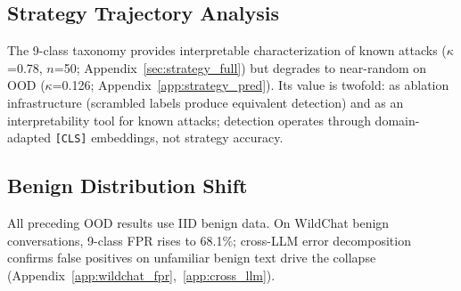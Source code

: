 \subsection{Strategy Trajectory Analysis}
\label{sec:strategy}

The 9-class taxonomy provides interpretable characterization of known attacks ($\kappa$=0.78, $n$=50; Appendix~\ref{sec:strategy_full}) but degrades to near-random on OOD ($\kappa$=0.126; Appendix~\ref{app:strategy_pred}). Its value is twofold: as ablation infrastructure (scrambled labels produce equivalent detection) and as an interpretability tool for known attacks; detection operates through domain-adapted \texttt{[CLS]} embeddings, not strategy accuracy.

\subsection{Benign Distribution Shift}
\label{sec:benign_shift}

All preceding OOD results use IID benign data. On WildChat benign conversations, 9-class FPR rises to 68.1\%; cross-LLM error decomposition confirms false positives on unfamiliar benign text drive the collapse (Appendix~\ref{app:wildchat_fpr},~\ref{app:cross_llm}).
